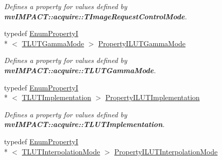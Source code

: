 \begin{DoxyCompactItemize}
\begin{DoxyCompactList}\small\item\em Defines a property for values defined by {\bfseries mv\+I\+M\+P\+A\+C\+T\+::acquire\+::\+T\+Image\+Request\+Control\+Mode}. \end{DoxyCompactList}\item 
\hypertarget{group___common_interface_gadd64b7cef36a40fd308cf7efe0209235}{typedef \hyperlink{classmv_i_m_p_a_c_t_1_1acquire_1_1_enum_property_i}{Enum\+Property\+I}\\*
$<$ \hyperlink{group___common_interface_gab9c7c29f6e598477f67fefe0b30addb0}{T\+L\+U\+T\+Gamma\+Mode} $>$ \hyperlink{group___common_interface_gadd64b7cef36a40fd308cf7efe0209235}{Property\+I\+L\+U\+T\+Gamma\+Mode}}\label{group___common_interface_gadd64b7cef36a40fd308cf7efe0209235}

\begin{DoxyCompactList}\small\item\em Defines a property for values defined by {\bfseries mv\+I\+M\+P\+A\+C\+T\+::acquire\+::\+T\+L\+U\+T\+Gamma\+Mode}. \end{DoxyCompactList}\item 
\hypertarget{group___common_interface_ga1188a6c6d64010982c28d3bb7b60b2f7}{typedef \hyperlink{classmv_i_m_p_a_c_t_1_1acquire_1_1_enum_property_i}{Enum\+Property\+I}\\*
$<$ \hyperlink{group___common_interface_ga7ba807ea2d27f199703d303b0901e243}{T\+L\+U\+T\+Implementation} $>$ \hyperlink{group___common_interface_ga1188a6c6d64010982c28d3bb7b60b2f7}{Property\+I\+L\+U\+T\+Implementation}}\label{group___common_interface_ga1188a6c6d64010982c28d3bb7b60b2f7}

\begin{DoxyCompactList}\small\item\em Defines a property for values defined by {\bfseries mv\+I\+M\+P\+A\+C\+T\+::acquire\+::\+T\+L\+U\+T\+Implementation}. \end{DoxyCompactList}\item 
\hypertarget{group___common_interface_ga2b9fd1a0f1dcf0867c527f11a1a1da65}{typedef \hyperlink{classmv_i_m_p_a_c_t_1_1acquire_1_1_enum_property_i}{Enum\+Property\+I}\\*
$<$ \hyperlink{group___common_interface_ga40d5450344b3aaaf127544ef3985cfbb}{T\+L\+U\+T\+Interpolation\+Mode} $>$ \hyperlink{group___common_interface_ga2b9fd1a0f1dcf0867c527f11a1a1da65}{Property\+I\+L\+U\+T\+Interpolation\+Mode}}\label{group___common_interface_ga2b9fd1a0f1dcf0867c527f11a1a1da65}


\end{DoxyCompactItemize}
